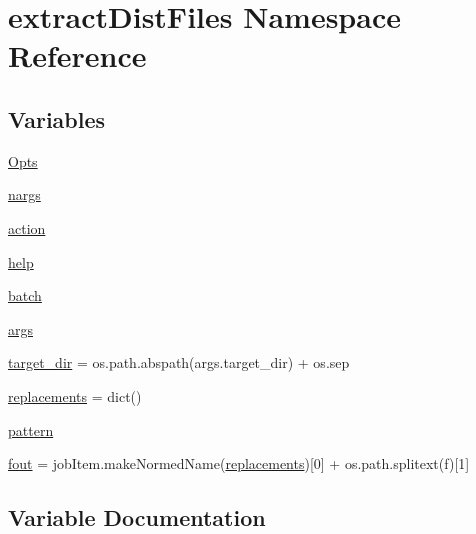 \hypertarget{namespaceextractDistFiles}{}\section{extract\+Dist\+Files Namespace Reference}
\label{namespaceextractDistFiles}
\subsection*{Variables}
\begin{DoxyCompactItemize}
\item 
\mbox{\hyperlink{namespaceextractDistFiles_aacd1a24a6b2030da59e3d446305c9807}{Opts}}
\item 
\mbox{\hyperlink{namespaceextractDistFiles_ae11fb925a9392c8dcae496919112e947}{nargs}}
\item 
\mbox{\hyperlink{namespaceextractDistFiles_ab8113c2d115c8f2c7d28367ede242abb}{action}}
\item 
\mbox{\hyperlink{namespaceextractDistFiles_a4709449f3230571b544eca81cdff6c61}{help}}
\item 
\mbox{\hyperlink{namespaceextractDistFiles_ac3dc82edcfff3e5287248919ff664854}{batch}}
\item 
\mbox{\hyperlink{namespaceextractDistFiles_ad9d1b3c57cbf765cdc4be6f8dc7a93e8}{args}}
\item 
\mbox{\hyperlink{namespaceextractDistFiles_a025b7c4b074d3f0a98c477259a401305}{target\+\_\+dir}} = os.\+path.\+abspath(args.\+target\+\_\+dir) + os.\+sep
\item 
\mbox{\hyperlink{namespaceextractDistFiles_ad44fb1dbb2afdfc360ff8705ea016dae}{replacements}} = dict()
\item 
\mbox{\hyperlink{namespaceextractDistFiles_a08a294486463ab2f4b412a17b0028fd9}{pattern}}
\item 
\mbox{\hyperlink{namespaceextractDistFiles_ac24482ee2b50491c20eccfa8ff90b6d7}{fout}} = job\+Item.\+make\+Normed\+Name(\mbox{\hyperlink{namespaceextractDistFiles_ad44fb1dbb2afdfc360ff8705ea016dae}{replacements}})\mbox{[}0\mbox{]} + os.\+path.\+splitext(f)\mbox{[}1\mbox{]}
\end{DoxyCompactItemize}


\subsection{Variable Documentation}
\mbox{\label{namespaceextractDistFiles_ab8113c2d115c8f2c7d28367ede242abb}} 
